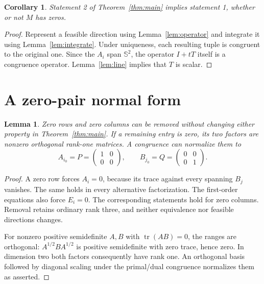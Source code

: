 \documentclass[11pt]{article}
\newtheorem{lemma}[theorem]{Lemma}
\newtheorem{corollary}[theorem]{Corollary}
\newcommand{\Sym}{\mathbb S^2}
\newcommand{\tr}{\operatorname{tr}}
\begin{document}
\begin{corollary}\label{cor:reverse}
Statement 2 of Theorem~\ref{thm:main} implies statement 1, whether or not $M$ has zeros.
\end{corollary}
\begin{proof}
Represent a feasible direction using Lemma~\ref{lem:operator} and integrate it using Lemma~\ref{lem:integrate}. Under uniqueness, each resulting tuple is congruent to the original one. Since the $A_i$ span $\Sym$, the operator $I+tT$ itself is a congruence operator. Lemma~\ref{lem:line} implies that $T$ is scalar.
\end{proof}

\section{A zero-pair normal form}
\begin{lemma}\label{lem:zero}
Zero rows and zero columns can be removed without changing either property in Theorem~\ref{thm:main}. If a remaining entry is zero, its two factors are nonzero orthogonal rank-one matrices. A congruence can normalize them to
\[
 A_{i_0}=P=\begin{pmatrix}1&0\\0&0\end{pmatrix},\qquad
 B_{j_0}=Q=\begin{pmatrix}0&0\\0&1\end{pmatrix}.
\]
\end{lemma}
\begin{proof}
A zero row forces $A_i=0$, because its trace against every spanning $B_j$ vanishes. The same holds in every alternative factorization. The first-order equations also force $E_i=0$. The corresponding statements hold for zero columns. Removal retains ordinary rank three, and neither equivalence nor feasible directions changes.

For nonzero positive semidefinite $A,B$ with $\tr(AB)=0$, the ranges are orthogonal: $A^{1/2}BA^{1/2}$ is positive semidefinite with zero trace, hence zero. In dimension two both factors consequently have rank one. An orthogonal basis followed by diagonal scaling under the primal/dual congruence normalizes them as asserted.
\end{proof}
\end{document}
